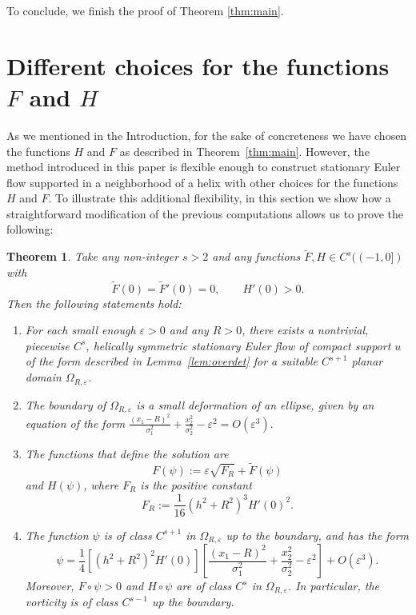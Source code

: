 \documentclass[12pt,reqno]{amsart}
\numberwithin{equation}{section}
\newtheorem{theorem}{Theorem}[section]
\theoremstyle{definition}
\theoremstyle{remark}
\begin{document}
To conclude, we finish the proof of Theorem \ref{thm:main}.



	\section{Different choices for the functions $F$ and $H$}\label{sec:different}

As we mentioned in the Introduction, for the sake of concreteness we have chosen the functions $H$ and $F$ as described in Theorem~\ref{thm:main}.
However, the method introduced in this paper is flexible enough to construct stationary Euler flow supported in a neighborhood of a helix with other choices for the functions $H$ and $F$.
To illustrate this additional flexibility, in this section we show how a straightforward modification of the previous computations allows us to prove the following:

\begin{theorem}\label{thm:different}
	Take any non-integer $s>2$ and any functions $\tilde F, H \in C^s((-1,0])$ with
	\[
	\tilde F(0) = \tilde F'(0) = 0 , \qquad H'(0) > 0 .
	\]
	Then the following statements hold:
	\begin{enumerate} 
		\item For each small enough $\varepsilon>0$ and any $R>0$, there exists a nontrivial, piecewise $C^s$, helically symmetric stationary Euler flow of compact support $u$ of the form described in Lemma~\ref{lem:overdet} for a suitable $C^{s+1}$ planar domain $\varOmega_{R,\varepsilon}$.
		\item The boundary of $\varOmega_{R,\varepsilon}$ is a small deformation of an ellipse, given by an equation of the form $\frac{(x_1-R)^2}{\sigma_1^2 }+\frac{x_2^2}{\sigma_2^2}-\varepsilon^2=O(\varepsilon^3).$
		\item The functions that define the solution are
		\[
		F(\psi) := \varepsilon \sqrt{F_R} + \tilde F(\psi)
		\]
		and $H(\psi)$, where $F_R$ is the positive constant
		\begin{equation}\label{eq:FR2}
		F_R := \frac1{16} \left (h^2+R^2\right )^3H'(0)^2.
		\end{equation}
		\item The function $\psi$ is of class $C^{s+1}$ in $\varOmega_{R,\varepsilon}$ up to the boundary, and has the form
		\[
	\psi = \frac14 \left [ \left( h^2+R^2\right)^2 H'(0)  \right ]
	\left [ \frac{(x_1-R)^2}{\sigma_1^2 }+\frac{x_2^2}{\sigma_2^2}-\varepsilon^2 \right ] + O(\varepsilon^3) .
	\]
		Moreover, $F\circ \psi > 0$ and $H\circ \psi$ are of class $C^s$ in $\varOmega_{R,\varepsilon}$.
		In particular, the vorticity is of class $C^{s-1}$ up the boundary.
	\end{enumerate}
\end{theorem}
\end{document}
